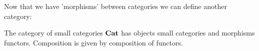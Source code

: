 Now that we have 'morphisms' between categories we can define another category:

\begin{example}
	The category of small categories ${\normalfont\textbf{Cat}}$ has objects small categories and morphisms functors. Composition is given by composition of functors.
\end{example}












